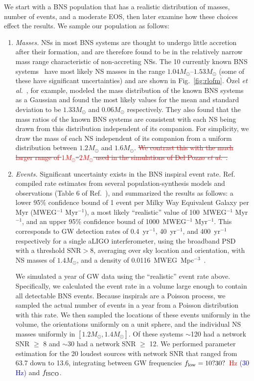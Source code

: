 \documentclass[twocolumn,prd,amssymb,aps,nofootinbib,showpacs,epsf]{revtex4}
\newcommand\ben[2]{\textcolor{red}{{#1}\sout{#2}}}
\newcommand\les[2]{\textcolor{blue}{{#1}\sout{#2}}}
\begin{document}
We start with a BNS population that has a realistic distribution of masses, number of events, and a moderate EOS, then later examine how these choices effect the results. We sample our population as follows:
\begin{enumerate}
\item \textit{Masses.} NSs in most BNS systems are thought to undergo little accretion after their formation, and are therefore found to be in the relatively narrow mass range characteristic of non-accreting NSs. The 10 currently known BNS systems~\cite{Lattimer2012} have most likely NS masses in the range $1.04M_\odot$--$1.53M_\odot$ (some of these have significant uncertainties) and are shown in Fig.~\ref{fig:rlofm}. \"Ozel {\it et al.}~\cite{OzelPsaltisNarayan2012}, for example, modeled the mass distribution of the known BNS systems as a Gaussian and found the most likely values for the mean and standard deviation to be $1.33M_\odot$ and $0.06M_\odot$ respectively. They also found that the mass ratios of the known BNS systems are consistent with each NS being drawn from this distribution independent of its companion. For simplicity, we draw the mass of each NS independent of its companion from a uniform distribution between $1.2M_\odot$ and $1.6M_\odot$. \ben{}{We contrast this with the much larger range of $1M_\odot$--$2M_\odot$ used in the simulations of Del Pozzo {\it et al.}~\cite{DelPozzoLiAgathos2013}.}

\item \textit{Events.} Significant uncertainty exists in the BNS inspiral event rate. Ref.~\cite{LIGORate2010} compiled rate estimates from several population-synthesis models and observations (Table 6 of Ref.~\cite{LIGORate2010}), and summarized the results as follows: a lower 95\% confidence bound of 1 event per Milky Way Equivalent Galaxy per Myr (MWEG$^{-1}$ Myr$^{-1}$), a most likely ``realistic'' value of 100~MWEG$^{-1}$ Myr$^{-1}$, and an upper 95\% confidence bound of 1000~MWEG$^{-1}$ Myr$^{-1}$. This corresponds to GW detection rates of 0.4~yr$^{-1}$, 40~yr$^{-1}$, and 400~yr$^{-1}$ respectively for a single aLIGO interferometer, using the broadband PSD with a threshold $\text{SNR} > 8$, averaging over sky location and orientation, with NS masses of $1.4M_\odot$, and a density of 0.0116~MWEG~Mpc$^{-3}$~\cite{LIGORate2010}. 

We simulated a year of GW data using the ``realistic'' event rate above. Specifically, we calculated the event rate in a volume large enough to contain all detectable BNS events. Because inspirals are a Poisson process, we sampled the actual number of events in a year from a Poisson distribution with this rate. We then sampled the locations of these events uniformly in the volume, the orientations uniformly on a unit sphere, and the individual NS masses uniformly in $[1.2M_\odot, 1.4M_\odot]$. Of these systems $\sim$120 had a network SNR $\ge$ 8 and $\sim$30 had a network SNR $\ge$ 12. We performed parameter estimation for the 20 loudest sources with network SNR that ranged from 63.7 down to 13.6, integrating between GW frequencies \ben{$f_{\rm low}=10?30?$~Hz}{} \les{(30 Hz)}{} and $f_{\rm ISCO}$.


\end{enumerate}
\end{document}
